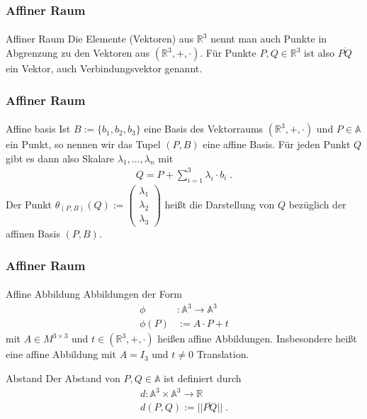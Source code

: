 \documentclass{beamer}
\begin{document}
\begin{frame}
    \frametitle{Affiner Raum}
\framesubtitle{}
\begin{block}{Affiner Raum}
Die Elemente (Vektoren) aus $\mathbb{R}^3$ nennt man auch  Punkte in Abgrenzung zu den Vektoren aus $(\mathbb{R}^3, + , \cdot )$.  
Für Punkte $P,Q \in \mathbb{R}^3$ ist also $\overline{PQ}$ ein Vektor, auch Verbindungsvektor genannt.
\end{block}

\end{frame}


\begin{frame}
    \frametitle{Affiner Raum}
\framesubtitle{}
\begin{block}{Affine basis}
Ist $B:= \{b_1, b_2 , b_3 \}$ eine Basis des Vektorraums  $(\mathbb{R}^3, + , \cdot )$ und $P \in \mathbb{A}$ ein Punkt, so nennen wir das Tupel
$(P, B)$ eine affine Basis. Für jeden Punkt $Q$ gibt es dann also Skalare $\lambda_1,\hdots ,\lambda_n$ mit 
\begin{align*}
Q = P + \sum_{i=1}^{3} \lambda_i \cdot b_i  \; .
\end{align*}
Der Punkt $\theta_{(P,B)}(Q):= \begin{pmatrix}  \lambda_1 \\   \lambda_2 \\  \lambda_3 \end{pmatrix}$ heißt die Darstellung von $Q$ bezüglich der affinen Basis $(P,B)$. 
\end{block}

\end{frame}



\begin{frame}
    \frametitle{Affiner Raum}
\framesubtitle{}
\begin{block}{Affine Abbildung}
Abbildungen der Form
\begin{align*}
\phi &: \mathbb{A}^3 \to \mathbb{A}^3 \\
\phi(P) & := A \cdot P + t
\end{align*} 
mit $A \in M^{3 \times 3}$ und $t \in (\mathbb{R}^3, + , \cdot )$ heißen affine Abbildungen.
Insbesondere heißt eine affine Abbildung mit $A = I_3$ und $t \neq 0$ Translation.
\end{block}
\begin{block}{Abstand}
Der Abstand von  $P,Q \in \mathbb{A}$  ist definiert durch
\begin{align*}
d : \mathbb{A}^3 \times \mathbb{A}^3 \to \mathbb{R} \\
d(P,Q) := || \overline{PQ} || \; .
\end{align*}
\end{block}

\end{frame}
\end{document}
